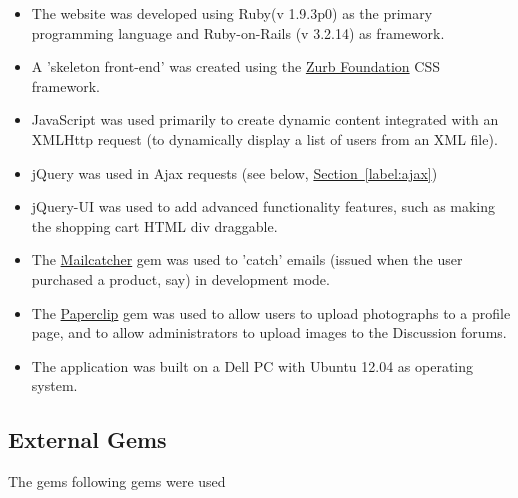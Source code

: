\documentclass[11pt]{article}
\begin{document}
\begin{itemize}[itemsep=1ex,leftmargin=1cm,rightmargin=1cm]
\item[] The website was developed using Ruby(v 1.9.3p0) 
as the primary programming language
and Ruby-on-Rails (v 3.2.14) as framework.

\item[]A 'skeleton front-end' was created
using the 
\href{http://zurb.com/}{Zurb Foundation}
CSS framework.   
\item[]JavaScript was used primarily to
create dynamic content integrated with an  XMLHttp request (to dynamically display
a list of users from an XML file). 
\item[] jQuery was used in Ajax requests (see below, \hyperlink{label:sectajax}{Section~\ref{label:ajax}})
\item[] jQuery-UI was used to add advanced functionality features,
such as making the shopping cart HTML div draggable. 
\item[] The 
\href{https://rubygems.org/gems/mailcatcher/}{Mailcatcher} 
gem was used to 'catch' emails (issued when the user purchased a product, say) 
in development mode.  
\item[] The \href{http://rubygems.org/gems/paperclip}{Paperclip}
gem was used to allow users to upload photographs to a profile page, and to allow
administrators to upload images to the Discussion forums. 
\item[] The application was built on a Dell PC with Ubuntu 12.04 as operating system. 
\end{itemize}



 
\subsection{External Gems}
The gems following gems were used
\end{document}
